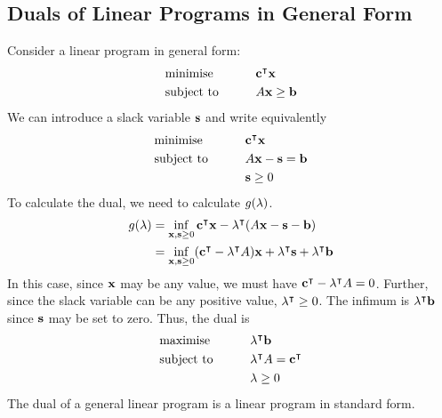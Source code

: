 \subsection{Duals of Linear Programs in General Form}
Consider a linear program in general form:
\begin{alignat*}{2}
    & \text{minimise} & \qquad & \vb c^\intercal \vb x     \\
    & \text{subject to}                             &        & A \vb x \geq \vb b   \\
\end{alignat*}
We can introduce a slack variable \( \vb s \) and write equivalently
\begin{alignat*}{2}
    & \text{minimise} & \qquad & \vb c^\intercal \vb x     \\
    & \text{subject to}                             &        & A \vb x - \vb s = \vb b   \\
    & & & \vb s \geq 0
\end{alignat*}
To calculate the dual, we need to calculate \( g(\vb \lambda) \).
\begin{align*}
    g(\vb \lambda) &= \inf_{\vb x, \vb s \geq 0} \vb c^\intercal \vb x - \vb \lambda^\intercal (A \vb x - \vb s - \vb b) \\
    &= \inf_{\vb x, \vb s \geq 0} (\vb c^\intercal - \vb \lambda^\intercal A) \vb x + \vb \lambda^\intercal \vb s + \vb \lambda^\intercal \vb b \\
\end{align*}
In this case, since \( \vb x \) may be any value, we must have \( \vb c^\intercal - \vb \lambda^\intercal A = 0 \).
Further, since the slack variable can be any positive value, \( \vb \lambda^\intercal \geq 0 \).
The infimum is \( \vb \lambda^\intercal \vb b \) since \( \vb s \) may be set to zero.
Thus, the dual is
\begin{alignat*}{2}
    & \text{maximise} & \qquad & \vb \lambda^\intercal \vb b     \\
    & \text{subject to}                             &        & \vb \lambda^\intercal A = \vb c^\intercal \\
    & & & \vb \lambda \geq 0
\end{alignat*}
The dual of a general linear program is a linear program in standard form.

